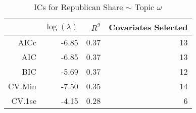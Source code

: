 \begin{table}[ht]
\centering
\begin{tabular}{rrrr}
  \hline
 & $\log(\lambda)$ & $R^2$ & Covariates Selected \\ 
  \hline
AICc & -6.85 & 0.37 &  13 \\ 
  AIC & -6.85 & 0.37 &  13 \\ 
  BIC & -5.69 & 0.37 &  12 \\ 
  CV.Min & -7.50 & 0.35 &  14 \\ 
  CV.1se & -4.15 & 0.28 &   6 \\ 
   \hline
\end{tabular}
\caption{ICs for Republican Share $\sim$ Topic $\omega$} 
\label{tab:topic_repshare}
\end{table}
